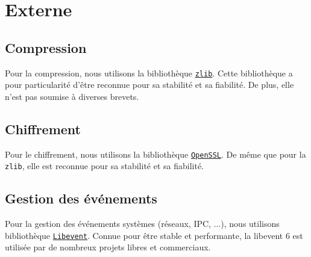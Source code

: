 \section{Externe}
\subsection{Compression}
Pour la compression, nous utilisons la bibliothèque \href{http://zlib.net/}{\texttt{zlib}}.
Cette bibliothèque a pour particularité d'être reconnue pour sa stabilité et sa fiabilité.
De plus, elle n'est pas soumise à diverses brevets.

\subsection{Chiffrement}
Pour le chiffrement, nous utilisons la bibliothèque \href{http://www.openssl.org/}{\texttt{OpenSSL}}.
De même que pour la \texttt{zlib}, elle est reconnue pour sa stabilité et sa fiabilité.


\subsection{Gestion des événements}
Pour la gestion des événements systèmes (réseaux, IPC, ...), nous utilisons bibliothèque \href{http://libevent.org/}{\texttt{Libevent}}.
Connue pour être stable et performante, la libevent 6 est utilisée
par de nombreux projets libres et commerciaux.

